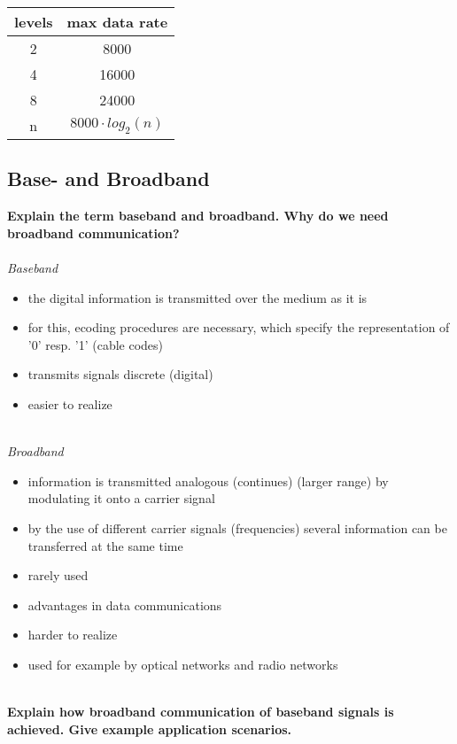 \documentclass[a4paper,12pt]{article}
\begin{document}
\begin{minipage}{0.9\linewidth}
	\centering
	\begin{tabular}{|c|c|} \hline
		\textbf{levels} & \textbf{max data rate} \\ \hline
		2 & 8000 \\
		4 & 16000 \\
		8 & 24000 \\ \hline
		n & $8000 \cdot log_{2}(n)$ \\ \hline 
	\end{tabular}
\end{minipage}

\subsection{Base- and Broadband}
\textbf{Explain the term baseband and broadband. Why do we need broadband communication?}\\
\\
\textit{Baseband}
\begin{itemize}[itemsep=0pt]
	\item  the digital information is transmitted over the medium as it is
	\item  for this, ecoding procedures are necessary, which specify the representation of '0' resp. '1' (cable codes)
	\item  transmits signals discrete (digital)
	\item  easier to realize
\end{itemize}
~\\
\textit{Broadband}
\begin{itemize}[itemsep=0pt]
	\item  information is transmitted analogous (continues) (larger range) by modulating it onto a carrier signal
	\item  by the use of different carrier signals (frequencies) several information can be transferred at the same time
	\item  rarely used
	\item  advantages in data communications
	\item  harder to realize
	\item  used for example by optical networks and radio networks
\end{itemize}
~\\
\textbf{Explain how broadband communication of baseband signals is achieved. Give example application scenarios.}\\
\end{document}

